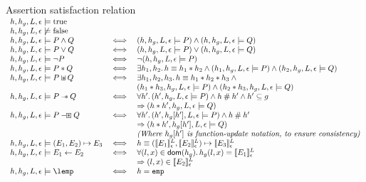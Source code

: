 \documentclass[a4paper]{article}
\begin{document}
\begin{display}{Assertion satisfaction relation}
  $\begin{array}{lcl}
    h,h_g,L,\env \satisfies \true \\
    h,h_g,L,\env \not\satisfies \false \\
    h,h_g,L,\env \satisfies P \land Q & \iff & (h,h_g,L,\env \satisfies
      P) \land (h,h_g,L,\env \satisfies Q) \\
    h,h_g,L,\env \satisfies P \lor Q & \iff & (h,h_g,L,\env \satisfies
      P) \lor (h,h_g,L,\env \satisfies Q) \\
    h,h_g,L,\env \satisfies \lnot P & \iff & \lnot(h,h_g,L,\env
      \satisfies P)\\
    h,h_g,L,\env \satisfies P \sep Q & \iff & \exists h_1,h_2 \st h \equiv h_1
      \sep h_2 \land (h_1,h_g,L,\env \satisfies P) \land (h_2,h_g,L,\env
      \satisfies Q) \\
    h,h_g,L,\env \satisfies P \sepish Q & \iff & \exists h_1,h_2,h_3 \st
      h \equiv h_1 \disju h_2 \disju h_3 \land {} \\
      && (h_1 \disju h_3, h_g, L, \env \satisfies P) \land
      (h_2 \disju h_3, h_g, L, \env \satisfies Q) \\
    h,h_g,L,\env \satisfies P \wand Q & \iff & \forall h' \st
      (h',h_g,L,\env \satisfies P) \land h \disj h' \land h' \subseteq g  \\
      & & \impl (h \disju h', h_g, L, \env \satisfies Q) \\
    h,h_g,L,\env \satisfies P \hysep Q & \iff &
      \forall h' \st (h',h_g[h'],L,\env \satisfies P) \land h \disj h' \\
      & & \impl (h \disju h', h_g[h'], L, \env \satisfies Q) \\
      & & \text{\emph{(Where $h_g[h']$ is function-update notation, to ensure
          consistency)}} \\
    h,h_g,L,\env \satisfies (E_1,E_2) \pointsto E_3 & \iff &
      h \equiv (\evalle{E_1}, \evalle{E_2}) \pointsto \evalle{E_3} \\
    h,h_g,L,\env \satisfies E_1 \bp E_2 & \iff & \forall (l,x) \in \dom(h_g) \st
      h_g(l,x) = \evalle{E_1} \\
      & & \impl (l,x) \in \evalle{E_2} \\
    h,h_g,L,\env \satisfies \lemp & \iff & h = \emp
  \end{array}$
\end{display}
\end{document}
